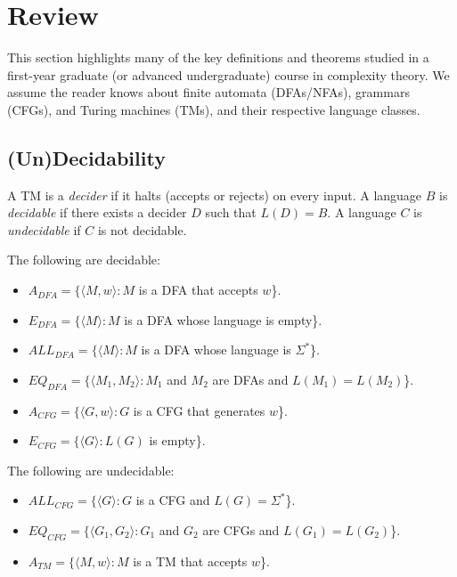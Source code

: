 \section{Review}
\label{sec:review}

This section highlights many of the key definitions and theorems studied in a first-year graduate (or advanced undergraduate) course in complexity theory. We assume the reader knows about finite automata (DFAs/NFAs), grammars (CFGs), and Turing machines (TMs), and their respective language classes.

\subsection{(Un)Decidability}

\begin{definition}
A TM is a \emph{decider} if it halts (accepts or rejects) on every input. A language $B$ is \emph{decidable} if there exists a decider $D$ such that $L(D) = B$. A language $C$ is \emph{undecidable} if $C$ is not decidable.
\end{definition}

\begin{theorem}
The following are decidable:
\begin{itemize}
\item $A_{DFA} = \{\langle M, w \rangle : M$ is a DFA that accepts $w$\}.
\item $E_{DFA} = \{\langle M \rangle : M$ is a DFA whose language is empty\}.
\item $ALL_{DFA} = \{\langle M \rangle : M$ is a DFA whose language is $\Sigma^*$\}.
\item $EQ_{DFA} = \{\langle M_1, M_2 \rangle : M_1$ and $M_2$ are DFAs and $L(M_1) = L(M_2)$\}.
\item $A_{CFG} = \{\langle G, w \rangle : G$ is a CFG that generates $w$\}.
\item $E_{CFG} = \{\langle G \rangle : L(G)$ is empty\}.
\end{itemize}
\end{theorem}

\begin{theorem}
The following are undecidable:
\begin{itemize}
\item $ALL_{CFG} = \{\langle G \rangle : G$ is a CFG and $L(G) = \Sigma^*$\}.
\item $EQ_{CFG} = \{\langle G_1, G_2 \rangle : G_1$ and $G_2$ are CFGs and $L(G_1) = L(G_2)$\}.
\item $A_{TM} = \{\langle M, w \rangle : M$ is a TM that accepts $w$\}.
\end{itemize}
\end{theorem}


